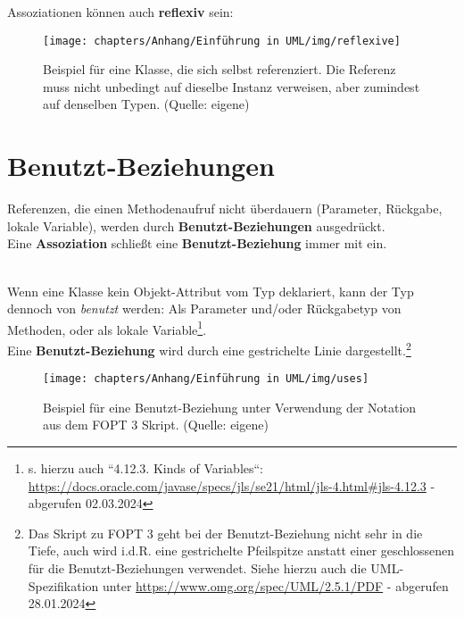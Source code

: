 \noindent
Assoziationen können auch \textbf{reflexiv} sein:


\begin{figure}
    \centering
    \texttt{[image: chapters/Anhang/Einführung in UML/img/reflexive]}
    \caption{Beispiel für eine Klasse, die sich selbst referenziert. Die Referenz muss nicht unbedingt auf dieselbe Instanz verweisen, aber zumindest auf denselben Typen. (Quelle: eigene)}
    \label{fig:reflexive}
\end{figure}

\newpage
\section{Benutzt-Beziehungen}

\begin{tcolorbox}[enlarge top by=0.5cm,enlarge bottom by=0.5cm]
    Referenzen, die einen Methodenaufruf nicht überdauern (Parameter, Rückgabe, lokale Variable), werden durch \textbf{Benutzt-Beziehungen} ausgedrückt.\\

    \noindent
    Eine \textbf{Assoziation} schließt eine \textbf{Benutzt-Beziehung} immer mit ein.
\end{tcolorbox}\\

\noindent
Wenn eine Klasse  kein Objekt-Attribut vom Typ  deklariert, kann der Typ  dennoch von  \textit{benutzt} werden: Als Parameter und/oder Rückgabetyp von Methoden, oder als lokale Variable\footnote{
s. hierzu auch ``4.12.3. Kinds of Variables``: \url{https://docs.oracle.com/javase/specs/jls/se21/html/jls-4.html#jls-4.12.3} - abgerufen 02.03.2024
}.\\
Eine \textbf{Benutzt-Beziehung} wird durch eine gestrichelte Linie dargestellt.\footnote{
Das Skript zu FOPT 3 geht bei der Benutzt-Beziehung nicht sehr in die Tiefe, auch wird i.d.R. eine gestrichelte Pfeilspitze anstatt einer geschlossenen für die Benutzt-Beziehungen verwendet. Siehe hierzu auch die UML-Spezifikation unter \url{https://www.omg.org/spec/UML/2.5.1/PDF} - abgerufen 28.01.2024
}


\begin{figure}
    \centering
    \texttt{[image: chapters/Anhang/Einführung in UML/img/uses]}
    \caption{Beispiel für eine Benutzt-Beziehung unter Verwendung der Notation aus dem FOPT 3 Skript. (Quelle: eigene)}
    \label{fig:uses}
\end{figure}

